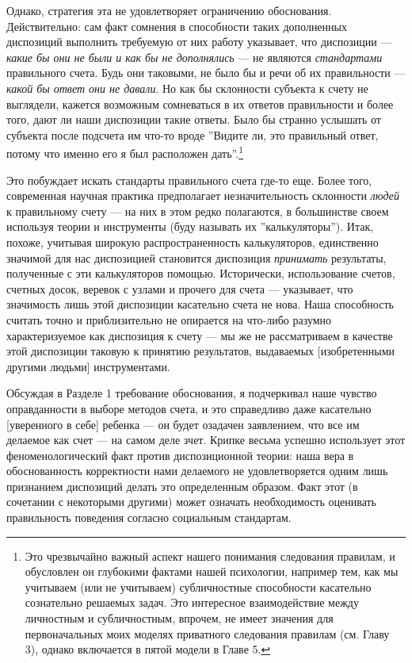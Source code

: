 \documentclass[11pt]{book}
\begin{document}
Однако, стратегия эта не удовлетворяет ограничению обоснования. Действительно: сам факт сомнения в способности таких дополненных диспозиций выполнить требуемую от них работу указывает, что диспозиции --- \textit{какие бы они не были и как бы не дополнялись} --- не являются \textit{стандартами} правильного счета. Будь они таковыми, не было бы и речи об их правильности --- \textit{какой бы ответ они не давали}. Но как бы склонности субъекта к счету не выглядели, кажется возможным сомневаться в их ответов правильности и более того, дают ли наши диспозиции такие ответы. Было бы странно услышать от субъекта после подсчета им что-то вроде ''Видите ли, это правильный ответ, потому что именно его я был расположен дать''.\footnote{Это чрезвычайно важный аспект нашего понимания следования правилам, и обусловлен он глубокими фактами нашей психологии, например тем, как мы учитываем (или не учитываем) субличностные способности касательно сознательно решаемых задач. Это интересное взаимодействие между личностным и субличностным, впрочем, не имеет значения для первоначальных моих моделях приватного следования правилам (см. Главу 3), однако включается в пятой модели в Главе 5.}

Это побуждает искать стандарты правильного счета где-то еще. Более того, современная научная практика предполагает незначительность склонности \textit{людей} к правильному счету --- на них в этом редко полагаются, в большинстве своем используя теории и инструменты (буду называть их ''калькуляторы''). Итак, похоже, учитывая широкую распространенность калькуляторов, единственно значимой для нас диспозицией становится диспозиция \textit{принимать} результаты, полученные с эти калькуляторов помощью. Исторически, использование счетов, счетных досок, веревок с узлами и прочего для счета --- указывает, что значимость лишь этой диспозиции касательно счета не нова. Наша способность считать точно и приблизительно не опирается на что-либо разумно характеризуемое как диспозиция к счету --- мы же не рассматриваем в качестве этой диспозиции таковую к принятию результатов, выдаваемых [изобретенными другими людьми] инструментами.

Обсуждая в Разделе 1 требование обоснования, я подчеркивал наше чувство оправданности в выборе методов счета, и это справедливо даже касательно [уверенного в себе] ребенка --- он будет озадачен заявлением, что все им делаемое как счет --- на самом деле зчет. Крипке весьма успешно использует этот феноменологический факт против диспозиционной теории: наша вера в обоснованность корректности нами делаемого не удовлетворяется одним лишь признанием диспозиций делать это определенным образом. Факт этот (в сочетании с некоторыми другими) может означать необходимость оценивать правильность поведения согласно социальным стандартам.
\end{document}
